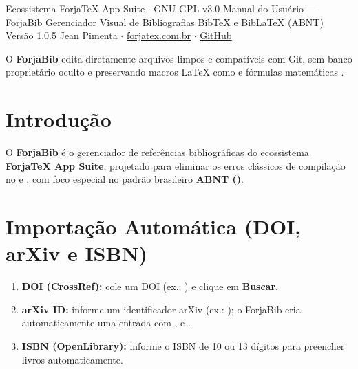 \documentclass[11pt,a4paper]{article}
\begin{document}
  {Ecossistema ForjaTeX App Suite $\cdot$ GNU GPL v3.0}
  {Manual do Usuário --- ForjaBib}
  {Gerenciador Visual de Bibliografias BibTeX e BibLaTeX (ABNT)}
  {Versão 1.0.5}
  {Jean Pimenta $\cdot$ \href{https://forjatex.com.br}{\color{fjsky}forjatex.com.br} $\cdot$ \href{https://github.com/jeanjpimenta/forjatex-suite}{\color{fjsky}GitHub}}


\begin{fjcallout}
O \textbf{ForjaBib} edita diretamente arquivos  limpos e compatíveis com Git, sem banco proprietário oculto e preservando macros \LaTeX{} como  e fórmulas matemáticas .
\end{fjcallout}

\section{Introdução}
O \textbf{ForjaBib} é o gerenciador de referências bibliográficas do ecossistema \textbf{ForjaTeX App Suite}, projetado para eliminar os erros clássicos de compilação no  e , com foco especial no padrão brasileiro \textbf{ABNT ()}.

\section{Importação Automática (DOI, arXiv e ISBN)}
\begin{enumerate}
  \item \textbf{DOI (CrossRef):} cole um DOI (ex.: ) e clique em \textbf{Buscar}.
  \item \textbf{arXiv ID:} informe um identificador arXiv (ex.: ); o ForjaBib cria automaticamente uma entrada  com ,  e .
  \item \textbf{ISBN (OpenLibrary):} informe o ISBN de 10 ou 13 dígitos para preencher livros automaticamente.
\end{enumerate}
\end{document}
